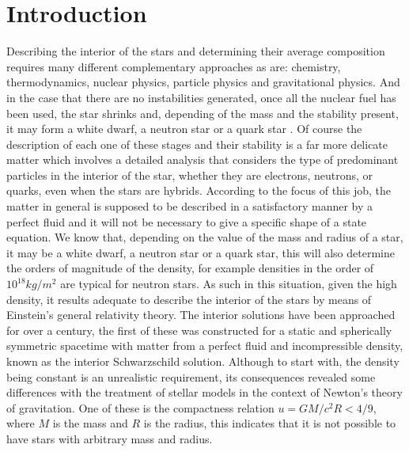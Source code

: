 \documentclass[12pt,onecolumn,a4paper]{article}
\begin{document}
\section{Introduction}
\label{sec1}
Describing the interior of the stars and determining their average composition requires many different complementary approaches as are: chemistry, thermodynamics, nuclear physics, particle physics and gravitational physics. And in the case that there are no instabilities generated, once all the nuclear fuel has been used, the star shrinks and, depending of the mass and the stability present, it may form a white dwarf, a neutron star or a quark star \cite{Shapiro,Kippenhahn}.  Of course the description of each one of these stages and their stability is a far more delicate matter which involves a detailed analysis that considers the type of predominant particles in the interior of the star, whether they are electrons, neutrons, or quarks, even when the stars are hybrids. According to the focus of this job, the matter in general is supposed to be described in a satisfactory manner by a perfect fluid and it will not be necessary to give a specific shape of a state equation. We know that, depending on the value of the mass and radius of a star, it may be a white dwarf, a neutron star or a quark star, this will also determine the orders of magnitude of the density, for example densities in the order of $10^{18}kg/m^2$ are typical for neutron stars. As such in this situation, given the high density, it results adequate to describe the interior of the stars by means of Einstein's general relativity theory.  The interior solutions have been approached for over a century, the first of these was constructed for a static and spherically symmetric spacetime with matter from a perfect fluid and incompressible density, known as the interior Schwarzschild solution. Although to start with, the density being constant is an unrealistic requirement, its consequences revealed some differences with the treatment of stellar models in the context of Newton's theory of gravitation. One of these is the compactness relation $u=GM/c^2R<4/9$, where $M$ is the mass and $R$ is the radius, this indicates that it is not possible to have stars with arbitrary mass and radius.
\end{document}
